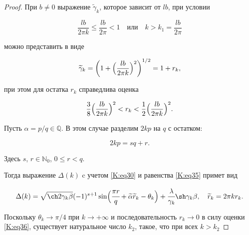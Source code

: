 \begin{proof}

При $b\neq0$ выражение $\widetilde{\gamma}_{k}$, которое зависит от $lb$, при условии

$$

\frac{lb}{2\pi k}\leq\frac{lb}{2\pi}<1

\quad \text{или} \quad 

k>k_{1}=\frac{lb}{2\pi}

$$

можно представить в виде

\begin{equation}

\label{K:eq35}

\widetilde{\gamma}_{k}=\biggl(1+\Bigl(\frac{lb}{2\pi k}\Bigr)^{2}\biggr)^{{1}/{2}}=1+r_{k},

\end{equation}

при этом для остатка $r_{k}$ справедлива оценка

\begin{equation}

\label{K:eq36}

\frac{3}{8}\Bigl(\frac{lb}{2\pi k}\Bigr)^{2}<r_{k}<\frac{1}{2}\Bigl(\frac{lb}{2\pi k}\Bigr)^{2}.

\end{equation}

Пусть $\alpha = p/q \in \mathbb{Q}$. В этом случае разделим $2kp$ на $q$  с остатком: 

$$2kp =sq+r.$$ 

Здесь $s$, $r \in \mathbb{N}_0$, $0\leq r <q$. 

Тогда выражение $\Delta (k)$ c учетом \eqref{K:eq30} и равенства \eqref{K:eq35} примет вид

\begin{equation}

\label{K:eq37}

\Delta (k)=\sqrt{\ch 2 \gamma_k \beta} (-1)^{s+1}\sin \Bigl(\cfrac{\pi r}q+\widetilde{\alpha}\widetilde{r}_{k} -\theta_k \Bigr) + \cfrac{\lambda}{\gamma_k}

\sh \gamma_{k}\beta,\quad \widetilde{r}_{k}=2\pi k r_{k}.

\end{equation}

Поскольку $\theta_k \rightarrow \pi /4$ при $k \rightarrow +\infty $ и последовательность $r_{k}\rightarrow 0$ в силу оценки \eqref{K:eq36}, существует натуральное число $k_2$, такое, что при всех $k>k_2$


\end{proof}
